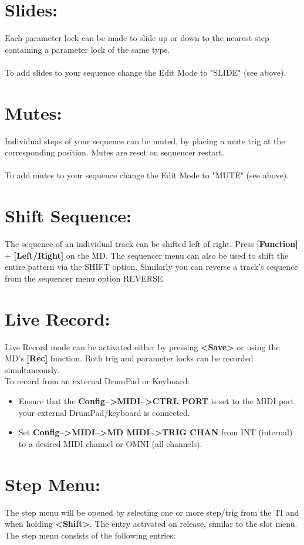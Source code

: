 \section{Slides:}
Each parameter lock can be made to slide up or down to the nearest step containing a parameter lock of the same type.
\\\\
To add slides to your sequence change the Edit Mode to "SLIDE" (see above).
\section{Mutes:}
Individual steps of your sequence can be muted, by placing a mute trig at the corresponding position. Mutes are reset on sequencer restart.\\\\ 
To add mutes to your sequence change the Edit Mode to "MUTE" (see above).
\section{Shift Sequence:}
The sequence of an individual track can be shifted left of right. Press \textbf{[Function]} + \textbf{[Left/Right]} on the MD. The sequencer menu can also be used to shift the entire pattern via the SHIFT option.
Similarly you can reverse a track's sequence from the sequencer menu option REVERSE.
\section{Live Record:}
Live Record mode can be activated either by pressing  \textbf{<Save>} or using the MD's \textbf{[Rec]} function. Both trig and parameter locks can be recorded simultaneously.\\
To record from an external DrumPad or Keyboard:
\begin{itemize}
    \item Ensure that the \textbf{Config-->MIDI-->CTRL PORT} is set to the MIDI port your external DrumPad/keyboard is connected.
    \item Set \textbf{Config-->MIDI-->MD MIDI-->TRIG CHAN} from INT (internal) to a desired MIDI channel or OMNI (all channels).
\end{itemize}
\newpage
\section{Step Menu:}
The step menu will be opened by selecting one or more step/trig from the TI and when holding \textbf{<Shift>}. The entry activated on release, similar to the slot menu.
The step menu consists of the following entries:

